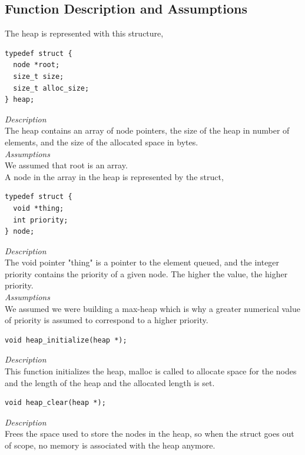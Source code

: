 \documentclass[11pt]{article}
\begin{document}
\subsection*{Function Description and Assumptions}
The heap is represented with this structure,

\begin{lstlisting}[style=customc]
typedef struct {
  node *root;
  size_t size;
  size_t alloc_size;
} heap;
\end{lstlisting}

\textit{Description} \\
The heap contains an array of node pointers, the size of the heap in number of
elements, and the size of the allocated space in bytes. \\
\textit{Assumptions} \\
We assumed that root is an array. \\

A node in the array in the heap is represented by the struct,

\begin{lstlisting}[style=customc]
typedef struct {
  void *thing;
  int priority;
} node;
\end{lstlisting}

\textit{Description}\\
The void pointer "thing" is a pointer to the element queued, and the integer
priority contains the priority of a given node.  The higher the value, the
higher priority. \\
\textit{Assumptions}\\
We assumed we were building a max-heap which is why a greater numerical value of
priority is assumed to correspond to a higher priority. \\

\begin{lstlisting}[style=customc]
void heap_initialize(heap *);
\end{lstlisting}
\textit{Description} \\
This function initializes the heap, malloc is called to allocate space for the
nodes and the length of the heap and the allocated length is set.

\begin{lstlisting}[style=customc]
void heap_clear(heap *);
\end{lstlisting}
\textit{Description}\\
Frees the space used to store the nodes in the heap, so when the struct goes out
of scope, no memory is associated with the heap anymore.
\end{document}
